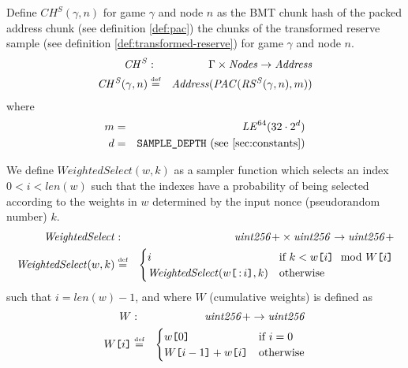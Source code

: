 \begin{definition}
\label{def:chs}
Define $\mathit{CH^S}(\gamma,n)$ for game $\gamma$ and node $n$ as the BMT chunk hash of the packed address chunk (see definition \ref{def:pac}) the chunks of the transformed reserve sample (see definition \ref{def:transformed-reserve}) for game $\gamma$ and node $n$.
%
\begin{eqnarray}
\mathit{CH^S}&:&\Gamma\times\mathit{Nodes}\to\mathit{Address}\\
\mathit{CH^S}(\gamma,n)&\overset{\textrm{\tiny def}}{=}&\mathit{Address}(\mathit{PAC}(\mathit{RS^S}(\gamma, n),m))
\end{eqnarray}
where
\begin{eqnarray}
m & = & \mathit{LE}^{64}(32\cdot 2^d)\\
d & = & \texttt{SAMPLE\_DEPTH} \text{ (see \ref{sec:constants})} 
\end{eqnarray}
\end{definition}

\begin{definition}
\label{def:weighted-selection}
We define $\mathit{WeightedSelect}(w,k)$ as a sampler function which selects an index $0<i<\mathit{len}(w)$ such that the indexes have a probability of being selected according to the weights in $w$ determined by the input nonce (pseudorandom number) $k$.
%
\begin{eqnarray}
\mathit{WeightedSelect}&:&\mathit{uint256}{+}\times\mathit{uint256}\to\mathit{uint256}{+}\\
\mathit{WeightedSelect}(w,k)&\overset{\textrm{\tiny def}}{=}&
\begin{cases}
    i&\text{if }k <w\texttt{[}\/i\/\texttt{]}\mod W\texttt{[}\/i\/\texttt{]}\\
\mathit{WeightedSelect}(w\texttt{[}\/\operatorname{:} i\/\texttt{]},k)&
\text{otherwise}
\end{cases}
\end{eqnarray}
such that $i=\mathit{len}(w)-1$,   
and
where $W$ (cumulative weights) is defined as
\begin{eqnarray}
W & : & \mathit{uint256}{+}\to\mathit{uint256}\\
W\texttt{[}\/i\/\texttt{]} &\overset{\textrm{\tiny def}}{=} & \begin{cases}
    w\texttt{[}\/0\/\texttt{]}&\text{if }i=0\\
    W\texttt{[}\/i-1\/\texttt{]}+w\texttt{[}\/i\/\texttt{]}&\text{otherwise}
\end{cases} 
\end{eqnarray}
\end{definition}



